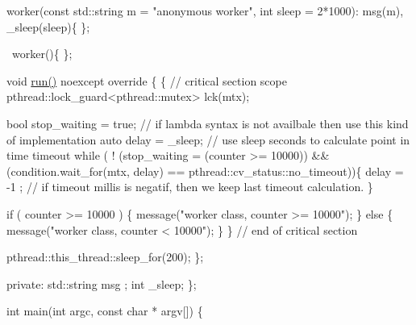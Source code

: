 \begin{DoxyPre}{\ttfamily   worker(const std::string m = "anonymous worker", int sleep = 2*1000): msg(m), \_sleep(sleep)\{
  \};}\end{DoxyPre}



\begin{DoxyPre}{\ttfamily   ~worker()\{
  \};}\end{DoxyPre}



\begin{DoxyPre}{\ttfamily   void \hyperlink{classpthread_1_1runnable_a4e0ce933602df83c096a37974ebedf84}{run()} noexcept override \{
    \{ // critical section scope
      pthread::lock\_guard<pthread::mutex> lck(mtx);}\end{DoxyPre}



\begin{DoxyPre}{\ttfamily       bool stop\_waiting = true; // if lambda syntax is not availbale then use this kind of implementation
      auto delay = \_sleep; // use sleep seconds to calculate point in time timeout
      while ( ! (stop\_waiting = (counter >= 10000)) \&\& (condition.wait\_for(mtx, delay) == pthread::cv\_status::no\_timeout))\{
        delay = -1 ; // if timeout millis is negatif, then we keep last timeout calculation.
      \}}\end{DoxyPre}



\begin{DoxyPre}{\ttfamily       if ( counter >= 10000 ) \{
        message("worker class, counter >= 10000");
      \} else \{
        message("worker class, counter < 10000");
      \}
    \} // end of critical section}\end{DoxyPre}



\begin{DoxyPre}{\ttfamily     pthread::this\_thread::sleep\_for(200);
  \};}\end{DoxyPre}



\begin{DoxyPre}{\ttfamily private:
  std::string    msg ;
  int            \_sleep;
\};}\end{DoxyPre}



\begin{DoxyPre}{\ttfamily int main(int argc, const char * argv[]) \{}\end{DoxyPre}



